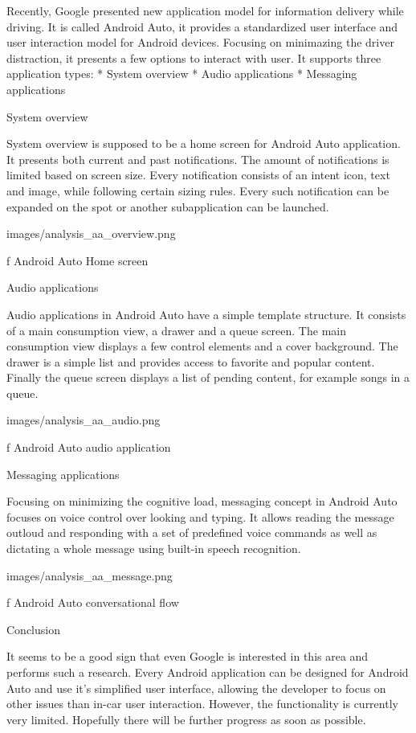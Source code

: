 Recently, Google presented new application model for information delivery while driving. It is called Android Auto, it provides a standardized user interface and user interaction model for Android devices. Focusing on minimazing the driver distraction, it presents a few options to interact with user. It supports three application types:
\begitems
* System overview
* Audio applications
* Messaging applications
\enditems

\seccc System overview

System overview is supposed to be a home screen for Android Auto application. It presents both current and past notifications. The amount of notifications is limited based on screen size. Every notification consists of an intent icon, text and image, while following certain sizing rules. Every such notification can be expanded on the spot or another subapplication can be launched.

\medskip
\centerline{\inspic images/analysis_aa_overview.png }\nobreak\medskip
\caption/f Android Auto Home screen

\seccc Audio applications

Audio applications in Android Auto have a simple template structure. It consists of a main consumption view, a drawer and a queue screen. The main consumption view displays a few control elements and a cover background. The drawer is a simple list and provides access to favorite and popular content. Finally the queue screen displays a list of pending content, for example songs in a queue.

\medskip
\centerline{\inspic images/analysis_aa_audio.png }\nobreak\medskip
\caption/f Android Auto audio application

\seccc Messaging applications

Focusing on minimizing the cognitive load, messaging concept in Android Auto focuses on voice control over looking and typing. It allows reading the message outloud and responding with a set of predefined voice commands as well as dictating a whole message using built-in speech recognition.

\medskip
\centerline{\inspic images/analysis_aa_message.png }\nobreak\medskip
\caption/f Android Auto conversational flow

\seccc Conclusion

It seems to be a good sign that even Google is interested in this area and performs such a research. Every Android application can be designed for Android Auto and use it's simplified user interface, allowing the developer to focus on other issues than in-car user interaction. However, the functionality is currently very limited. Hopefully there will be further progress as soon as possible.

